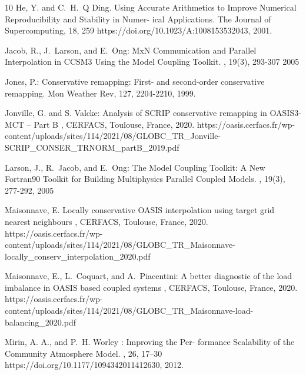 \begin{thebibliography}{10}
He, Y. and C.~H.~Q Ding.
\newblock Using Accurate Arithmetics to Improve Numerical Reproducibility and Stability in Numer- ical Applications.
\newblock The Journal of Supercomputing, 18, 259
\newblock https://doi.org/10.1023/A:1008153532043, 2001.

Jacob, R., J.~Larson, and E.~Ong:
\newblock MxN Communication and Parallel Interpolation in CCSM3 Using the Model Coupling Toolkit.
, 19(3), 293-307 2005

Jones, P.:
\newblock Conservative remapping: First- and second-order conservative remapping.
\newblock Mon Weather Rev, 127, 2204-2210, 1999.

Jonville, G. and S. Valcke:
\newblock Analysis of SCRIP conservative remapping in OASIS3-MCT –
Part B
,
\newblock CERFACS, Toulouse, France, 2020.
\newblock https://oasis.cerfacs.fr/wp-content/uploads/sites/114/2021/08/GLOBC\_TR\_Jonville-SCRIP\_CONSER\_TRNORM\_partB\_2019.pdf

Larson, J., R.~Jacob, and E.~Ong:
\newblock The Model Coupling Toolkit: A New Fortran90 Toolkit for Building Multiphysics Parallel Coupled Models.
, 19(3), 277-292, 2005

Maisonnave, E.
\newblock Locally conservative OASIS interpolation using target grid nearest neighbours
,
\newblock CERFACS, Toulouse, France, 2020.
\newblock https://oasis.cerfacs.fr/wp-content/uploads/sites/114/2021/08/GLOBC\_TR\_Maisonnave-locally\_conserv\_interpolation\_2020.pdf

Maisonnave, E., L.~Coquart, and A.~Piacentini:
\newblock A better diagnostic of the load imbalance in OASIS based coupled systems
,
\newblock CERFACS, Toulouse, France, 2020.
\newblock https://oasis.cerfacs.fr/wp-content/uploads/sites/114/2021/08/GLOBC\_TR\_Maisonnave-load-balancing\_2020.pdf

Mirin, A. A., and P.~H. Worley :
\newblock Improving the Per- formance Scalability of the Community Atmosphere Model.
, 26, 17–30
\newblock https://doi.org/10.1177/1094342011412630, 2012.


\end{thebibliography}
